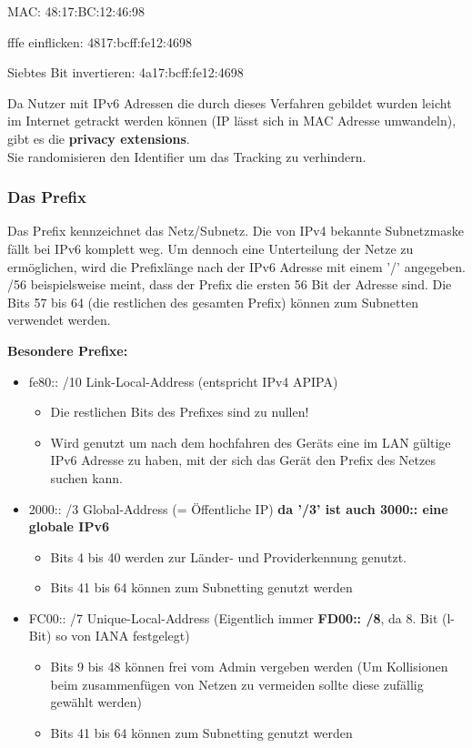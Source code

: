 \documentclass[asp1.tex]{subfiles}
\begin{document}
MAC: 48:17:BC:12:46:98

fffe einflicken: 4817:bcff:fe12:4698

Siebtes Bit invertieren: 4a17:bcff:fe12:4698

Da Nutzer mit IPv6 Adressen die durch dieses Verfahren gebildet wurden leicht im Internet getrackt werden können (IP lässt sich in MAC Adresse umwandeln), gibt es die \textbf{privacy extensions}.\\
Sie randomisieren den Identifier um das Tracking zu verhindern.

\subsubsection{Das Prefix}

Das Prefix kennzeichnet das Netz/Subnetz. Die von IPv4 bekannte Subnetzmaske fällt bei IPv6 komplett weg. Um dennoch eine Unterteilung der Netze zu ermöglichen, wird die Prefixlänge nach der IPv6 Adresse mit einem '/' angegeben. /56 beispielsweise meint, dass der Prefix die ersten 56 Bit der Adresse sind. Die Bits 57 bis 64 (die restlichen des gesamten Prefix) können zum Subnetten verwendet werden.

\textbf{Besondere Prefixe:}
\begin{itemize}
    \item fe80:: /10 \textrightarrow\space Link-Local-Address (entspricht IPv4 APIPA)\\
        \begin{itemize}
            \item Die restlichen Bits des Prefixes sind zu nullen!
            \item Wird genutzt um nach dem hochfahren des Geräts eine im LAN gültige IPv6 Adresse zu haben, mit der sich das Gerät den Prefix des Netzes suchen kann.
        \end{itemize}
    \item 2000:: /3 \textrightarrow\space Global-Address (= Öffentliche IP) \textbf{da '/3' ist auch 3000:: eine globale IPv6}
        \begin{itemize}
            \item Bits 4 bis 40 werden zur Länder- und Providerkennung genutzt.
            \item Bits 41 bis 64 können zum Subnetting genutzt werden
        \end{itemize}
    \item FC00:: /7 \textrightarrow\space Unique-Local-Address (Eigentlich immer \textbf{FD00:: /8}, da 8. Bit (l-Bit) so von IANA festgelegt)
       \begin{itemize}
           \item Bits 9 bis 48 können frei vom Admin vergeben werden (Um Kollisionen beim zusammenfügen von Netzen zu vermeiden sollte diese zufällig gewählt werden)
           \item Bits 41 bis 64 können zum Subnetting genutzt werden
       \end{itemize}
\end{itemize}
\end{document}
